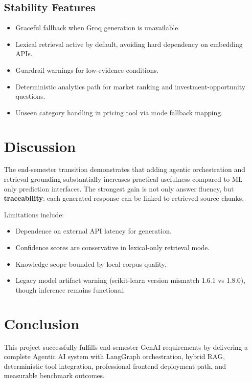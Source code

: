 \documentclass[12pt,a4paper]{article}
\begin{document}
\subsection{Stability Features}
\begin{itemize}[leftmargin=1.6em]
  \item Graceful fallback when Groq generation is unavailable.
  \item Lexical retrieval active by default, avoiding hard dependency on embedding APIs.
  \item Guardrail warnings for low-evidence conditions.
  \item Deterministic analytics path for market ranking and investment-opportunity questions.
  \item Unseen category handling in pricing tool via mode fallback mapping.
\end{itemize}

\section{Discussion}
The end-semester transition demonstrates that adding agentic orchestration and retrieval grounding substantially increases practical usefulness compared to ML-only prediction interfaces. The strongest gain is not only answer fluency, but \textbf{traceability}: each generated response can be linked to retrieved source chunks.

Limitations include:
\begin{itemize}[leftmargin=1.6em]
  \item Dependence on external API latency for generation.
  \item Confidence scores are conservative in lexical-only retrieval mode.
  \item Knowledge scope bounded by local corpus quality.
  \item Legacy model artifact warning (scikit-learn version mismatch 1.6.1 vs 1.8.0), though inference remains functional.
\end{itemize}

\section{Conclusion}
This project successfully fulfills end-semester GenAI requirements by delivering a complete Agentic AI system with LangGraph orchestration, hybrid RAG, deterministic tool integration, professional frontend deployment path, and measurable benchmark outcomes.
\end{document}
